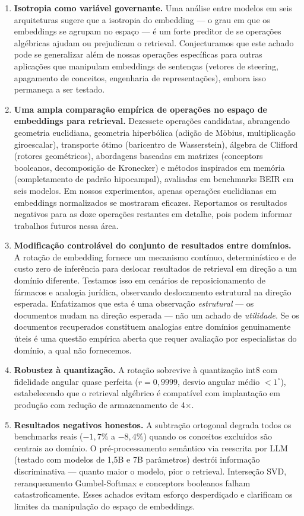 \documentclass{article}
\begin{document}
\begin{enumerate}
\item \textbf{Isotropia como variável governante.} Uma análise entre modelos em seis arquiteturas sugere que a isotropia do embedding --- o grau em que os embeddings se agrupam no espaço --- é um forte preditor de se operações algébricas ajudam ou prejudicam o retrieval. Conjecturamos que este achado pode se generalizar além de nossas operações específicas para outras aplicações que manipulam embeddings de sentenças (vetores de steering, apagamento de conceitos, engenharia de representações), embora isso permaneça a ser testado.

\item \textbf{Uma ampla comparação empírica de operações no espaço de embeddings para retrieval.} Dezessete operações candidatas, abrangendo geometria euclidiana, geometria hiperbólica (adição de M\"{o}bius, multiplicação giroescalar), transporte ótimo (baricentro de Wasserstein), álgebra de Clifford (rotores geométricos), abordagens baseadas em matrizes (conceptors booleanos, decomposição de Kronecker) e métodos inspirados em memória (completamento de padrão hipocampal), avaliadas em benchmarks BEIR em seis modelos. Em nossos experimentos, apenas operações euclidianas em embeddings normalizados se mostraram eficazes. Reportamos os resultados negativos para as doze operações restantes em detalhe, pois podem informar trabalhos futuros nessa área.

\item \textbf{Modificação controlável do conjunto de resultados entre domínios.} A rotação de embedding fornece um mecanismo contínuo, determinístico e de custo zero de inferência para deslocar resultados de retrieval em direção a um domínio diferente. Testamos isso em cenários de reposicionamento de fármacos e analogia jurídica, observando deslocamento estrutural na direção esperada. Enfatizamos que esta é uma observação \emph{estrutural} --- os documentos mudam na direção esperada --- não um achado de \emph{utilidade}. Se os documentos recuperados constituem analogias entre domínios genuinamente úteis é uma questão empírica aberta que requer avaliação por especialistas do domínio, a qual não fornecemos.

\item \textbf{Robustez à quantização.} A rotação sobrevive à quantização int8 com fidelidade angular quase perfeita ($r = 0{,}9999$, desvio angular médio $< 1^{\circ}$), estabelecendo que o retrieval algébrico é compatível com implantação em produção com redução de armazenamento de 4$\times$.

\item \textbf{Resultados negativos honestos.} A subtração ortogonal degrada todos os benchmarks reais ($-1{,}7\%$ a $-8{,}4\%$) quando os conceitos excluídos são centrais ao domínio. O pré-processamento semântico via reescrita por LLM (testado com modelos de 1,5B e 7B parâmetros) destrói informação discriminativa --- quanto maior o modelo, pior o retrieval. Interseção SVD, reranqueamento Gumbel-Softmax e conceptors booleanos falham catastroficamente. Esses achados evitam esforço desperdiçado e clarificam os limites da manipulação do espaço de embeddings.
\end{enumerate}
\end{document}

